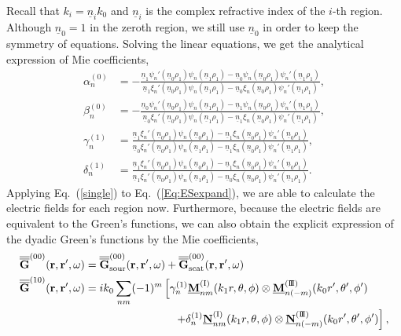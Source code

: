 \documentclass[journal=jacsat,manuscript=article,layout=traditional]{achemso}
\newcommand*\tensorg{\overline{\overline{\mathbf{G}}}}
\newcommand{\norF}[1]{\underline{\vb{#1}}}
\newcommand{\nr}{\underline{n}}
\newcommand{\joinR}{\hspace{-.17em}}
\newcommand{\RomanI}{\scriptsize\textrm{I}}
\newcommand{\RomanIII}{\mbox{\RomanI\joinR\RomanI\joinR\RomanI}}
\begin{document}
Recall that $k_i=\nr_ik_0$ and $\nr_i$ is the complex refractive index of the $i$-th region.
Although $\nr_0=1$ in the zeroth region, we still use $\nr_0$ in order to keep the symmetry of equations.
Solving the linear equations, we get the analytical expression of Mie coefficients,
\begin{subequations}
    \begin{align}
        \alpha_n^{(0)} &=-
        \frac{\nr_1\psi_n'(\nr_0\rho_1)\psi_n(\nr_1\rho_1)-\nr_0\psi_n(\nr_0\rho_1)\psi_n'(\nr_1\rho_1)}
        {\nr_1\xi_n'(\nr_0\rho_1)\psi_n(\nr_1\rho_1)-\nr_0\xi_n(\nr_0\rho_1)\psi_n'(\nr_1\rho_1)},\\
        \beta_n^{(0)} &=-
        \frac{\nr_0\psi_n'(\nr_0\rho_1)\psi_n(\nr_1\rho_1)-\nr_1\psi_n(\nr_0\rho_1)\psi_n'(\nr_1\rho_1)}
        {\nr_0\xi_n'(\nr_0\rho_1)\psi_n(\nr_1\rho_1)-\nr_1\xi_n(\nr_0\rho_1)\psi_n'(\nr_1\rho_1)},\\
        \gamma_n^{(1)} &=
        \frac{\nr_1\xi_n'(\nr_0\rho_1)\psi_n(\nr_0\rho_1)-\nr_1\xi_n(\nr_0\rho_1)\psi_n'(\nr_0\rho_1)}
        {\nr_0\xi_n'(\nr_0\rho_1)\psi_n(\nr_1\rho_1)-\nr_1\xi_n(\nr_0\rho_1)\psi_n'(\nr_1\rho_1)},\\
        \delta_n^{(1)} &=
        \frac{\nr_1\xi_n'(\nr_0\rho_1)\psi_n(\nr_0\rho_1)-\nr_1\xi_n(\nr_0\rho_1)\psi_n'(\nr_0\rho_1)}
        {\nr_1\xi_n'(\nr_0\rho_1)\psi_n(\nr_1\rho_1)-\nr_0\xi_n(\nr_0\rho_1)\psi_n'(\nr_1\rho_1)}.
    \end{align}
    \label{single}%
\end{subequations}
Applying Eq.~(\ref{single}) to Eq.~(\ref{Eq:ESexpand}), we are able to calculate the electric fields for each region now.
Furthermore, because the electric fields are equivalent to the Green's functions, we can also obtain the explicit expression of the dyadic Green's functions by the Mie coefficients,
\begin{align}
    \tensorg^{(00)}(\mathbf{r,r'},\omega)&=
    \tensorg_\mathrm{sour}^{(00)}(\mathbf{r,r'},\omega)+
    \tensorg_\mathrm{scat}^{(00)}(\mathbf{r,r'},\omega)\\
    \nonumber
    \tensorg^{(10)}(\mathbf{r,r'},\omega)&=
    ik_0 \sum_{nm}(-1)^m
    \left[\gamma_n^{(1)}\norF{M}_{\mathstrut{nm}}^{(\RomanI)}(k_1r,\theta,\phi)
    \otimes\norF{M}_{n(-m)}^{(\RomanIII)}(k_0r',\theta',\phi')\right.\\
    &\hspace{2.85 cm}
    \left.+\delta_n^{(1)}\norF{N}_{\mathstrut{nm}}^{(\RomanI)}(k_1r,\theta,\phi)\otimes
    \norF{N}_{n(-m)}^{(\RomanIII)}(k_0r',\theta',\phi')\right],
\end{align}
\end{document}
